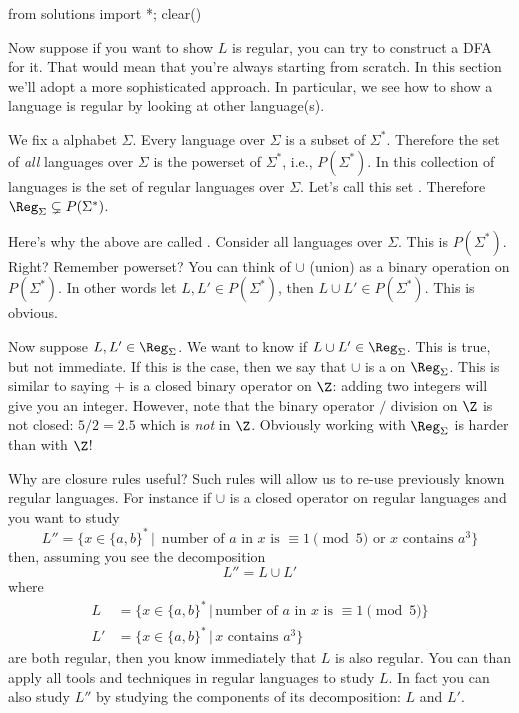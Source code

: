 \begin{python0}
from solutions import *; clear()
\end{python0}

Now suppose if you want to show $L$ is regular, you can try to
construct a DFA for it. That would mean that you're always starting
from scratch. In this section we'll adopt a more sophisticated
approach. In particular, we see how to show a language is regular by
looking at other language(s).

We fix a alphabet $\Sigma$.
Every language over $\Sigma$ is a
subset of $\Sigma^*$. Therefore the set of
\textit{all} languages
over $\Sigma$ is the powerset of $\Sigma^*$, i.e., $P(\Sigma^*)$.
In this collection of languages is the set of regular languages
over $\Sigma$. Let's call this set . Therefore
$\Reg_\Sigma \subsetneq P(\Sigma^*)$.

Here's why the above are called . Consider all
languages over $\Sigma$. This is $P(\Sigma^*)$. Right? Remember
powerset? You can think of $\cup$ (union) as a binary operation on
$P(\Sigma^*)$. In other words let $L, L' \in P(\Sigma^*)$, then
$L \cup L' \in P(\Sigma^*)$.
This is obvious.

Now suppose $L,L' \in \Reg_\Sigma$.
We want to know if $L \cup L' \in \Reg_\Sigma$.
This is true, but not immediate.
If this is the case, then
we say that $\cup$ is a  on $\Reg_\Sigma$.
This is similar to saying $+$ is a closed binary operator on $\Z$: adding two integers
will give you an integer.
However, note that the binary operator $/$ division on $\Z$ is not closed:
$5 / 2 = 2.5$ which is \textit{not} in $\Z$.
Obviously working with $\Reg_\Sigma$ is harder than with $\Z$!

Why are closure rules useful? Such rules will allow us to re-use previously
known regular languages. For instance if $\cup$ is a closed
operator on regular languages and
you want to study
\[
  L'' = \{ x \in \{a,b\}^* \,|\, \text{ number of $a$ in $x$ is } \equiv 1 \pmod{5}
  \text{ or $x$ contains $a^3$} \}
\]
then, assuming you see the decomposition
\[
L'' = L \cup L'
\]
where
\begin{align*}
 L &= \{ x \in \{a,b\}^* \,|\, \text{number of $a$ in $x$ is } \equiv 1 \pmod{5}
 \}\\
 L' &= \{ x \in \{a,b\}^* \,|\, x \text{ contains } a^3 \}
\end{align*}
are both regular, then you know immediately that $L$ is also regular.
You can than apply all tools and techniques in regular languages to study $L$.
In fact you can also study $L''$ by studying the components of
its decomposition: $L$ and $L'$.

